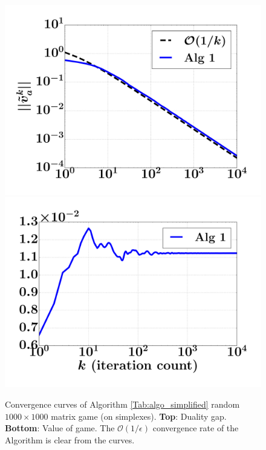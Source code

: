 \documentclass[12pt]{article}
\begin{document}
\begin{figure}
  \includegraphics[width=1\linewidth]{simplex_dgap.pdf}
  \includegraphics[width=1\linewidth]{simplex_NE.pdf}
  \caption{Convergence curves of Algorithm \ref{Tab:algo_simplified} random $1000 \times 1000$ matrix game (on simplexes).
  \textbf{Top}: Duality gap. \textbf{Bottom}: Value of game.
   The $\mathcal{O}(1/\epsilon)$ convergence rate of the Algorithm is clear from the curves.}
  \label{Tab:sim_dgap_curve}
\end{figure}
\end{document}
